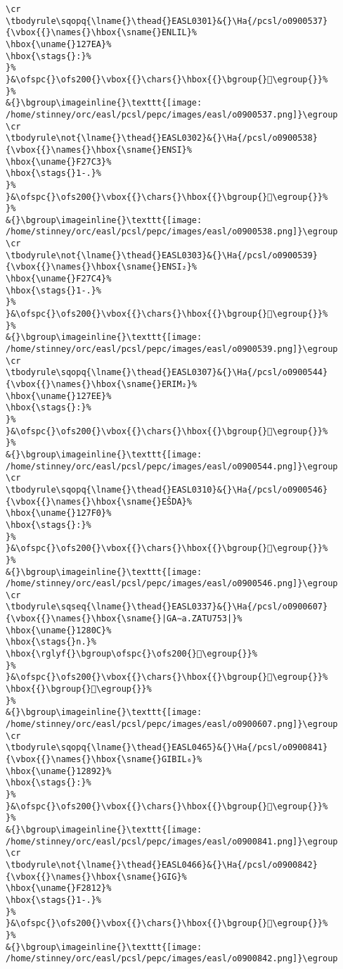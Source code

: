 \begin{verbatim}
\cr
\tbodyrule\sqopq{\lname{}\thead{}EASL0301}&{}\Ha{/pcsl/o0900537}{\vbox{{}\names{}\hbox{\sname{}ENLIL}%
\hbox{\uname{}127EA}%
\hbox{\stags{}:}%
}%
}&\ofspc{}\ofs200{}\vbox{{}\chars{}\hbox{{}\bgroup{}𒟪\egroup{}}%
}%
&{}\bgroup\imageinline{}\texttt{[image: /home/stinney/orc/easl/pcsl/pepc/images/easl/o0900537.png]}\egroup
\cr
\tbodyrule\not{\lname{}\thead{}EASL0302}&{}\Ha{/pcsl/o0900538}{\vbox{{}\names{}\hbox{\sname{}ENSI}%
\hbox{\uname{}F27C3}%
\hbox{\stags{}1-.}%
}%
}&\ofspc{}\ofs200{}\vbox{{}\chars{}\hbox{{}\bgroup{}󲟃\egroup{}}%
}%
&{}\bgroup\imageinline{}\texttt{[image: /home/stinney/orc/easl/pcsl/pepc/images/easl/o0900538.png]}\egroup
\cr
\tbodyrule\not{\lname{}\thead{}EASL0303}&{}\Ha{/pcsl/o0900539}{\vbox{{}\names{}\hbox{\sname{}ENSI₂}%
\hbox{\uname{}F27C4}%
\hbox{\stags{}1-.}%
}%
}&\ofspc{}\ofs200{}\vbox{{}\chars{}\hbox{{}\bgroup{}󲟄\egroup{}}%
}%
&{}\bgroup\imageinline{}\texttt{[image: /home/stinney/orc/easl/pcsl/pepc/images/easl/o0900539.png]}\egroup
\cr
\tbodyrule\sqopq{\lname{}\thead{}EASL0307}&{}\Ha{/pcsl/o0900544}{\vbox{{}\names{}\hbox{\sname{}ERIM₂}%
\hbox{\uname{}127EE}%
\hbox{\stags{}:}%
}%
}&\ofspc{}\ofs200{}\vbox{{}\chars{}\hbox{{}\bgroup{}𒟮\egroup{}}%
}%
&{}\bgroup\imageinline{}\texttt{[image: /home/stinney/orc/easl/pcsl/pepc/images/easl/o0900544.png]}\egroup
\cr
\tbodyrule\sqopq{\lname{}\thead{}EASL0310}&{}\Ha{/pcsl/o0900546}{\vbox{{}\names{}\hbox{\sname{}EŠDA}%
\hbox{\uname{}127F0}%
\hbox{\stags{}:}%
}%
}&\ofspc{}\ofs200{}\vbox{{}\chars{}\hbox{{}\bgroup{}𒟰\egroup{}}%
}%
&{}\bgroup\imageinline{}\texttt{[image: /home/stinney/orc/easl/pcsl/pepc/images/easl/o0900546.png]}\egroup
\cr
\tbodyrule\sqseq{\lname{}\thead{}EASL0337}&{}\Ha{/pcsl/o0900607}{\vbox{{}\names{}\hbox{\sname{}|GA∼a.ZATU753|}%
\hbox{\uname{}1280C}%
\hbox{\stags{}n.}%
\hbox{\rglyf{}\bgroup\ofspc{}\ofs200{}𒠌\egroup{}}%
}%
}&\ofspc{}\ofs200{}\vbox{{}\chars{}\hbox{{}\bgroup{}𒠌\egroup{}}%
\hbox{{}\bgroup{}𒠐\egroup{}}%
}%
&{}\bgroup\imageinline{}\texttt{[image: /home/stinney/orc/easl/pcsl/pepc/images/easl/o0900607.png]}\egroup
\cr
\tbodyrule\sqopq{\lname{}\thead{}EASL0465}&{}\Ha{/pcsl/o0900841}{\vbox{{}\names{}\hbox{\sname{}GIBIL₆}%
\hbox{\uname{}12892}%
\hbox{\stags{}:}%
}%
}&\ofspc{}\ofs200{}\vbox{{}\chars{}\hbox{{}\bgroup{}𒢒\egroup{}}%
}%
&{}\bgroup\imageinline{}\texttt{[image: /home/stinney/orc/easl/pcsl/pepc/images/easl/o0900841.png]}\egroup
\cr
\tbodyrule\not{\lname{}\thead{}EASL0466}&{}\Ha{/pcsl/o0900842}{\vbox{{}\names{}\hbox{\sname{}GIG}%
\hbox{\uname{}F2812}%
\hbox{\stags{}1-.}%
}%
}&\ofspc{}\ofs200{}\vbox{{}\chars{}\hbox{{}\bgroup{}󲠒\egroup{}}%
}%
&{}\bgroup\imageinline{}\texttt{[image: /home/stinney/orc/easl/pcsl/pepc/images/easl/o0900842.png]}\egroup

\end{verbatim}
